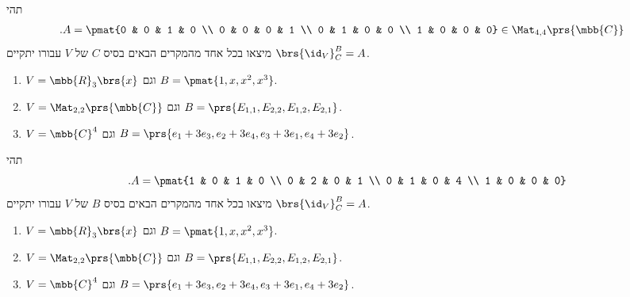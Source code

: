 \documentclass[a4paper,10pt,twoside,openany]{article}
\begin{document}
\begin{exercise}
תהי
\begin{align*}
\text{.} A &= \pmat{0 & 0 & 1 & 0 \\ 0 & 0 & 0 & 1 \\ 0 & 1 & 0 & 0 \\ 1 & 0 & 0 & 0} \in \Mat_{4,4}\prs{\mbb{C}}
\end{align*}
מיצאו בכל אחד מהמקרים הבאים בסיס
$C$
של
$V$
עבורו יתקיים
$\brs{\id_V}^B_C = A$.

\begin{enumerate}
\item $V = \mbb{R}_3\brs{x}$
וגם
$B = \pmat{1,x,x^2,x^3}$.

\item $V = \Mat_{2,2}\prs{\mbb{C}}$
וגם
$B = \prs{E_{1,1}, E_{2,2}, E_{1,2}, E_{2,1}}$.

\item $V = \mbb{C}^4$
וגם
$B = \prs{e_1 + 3e_3, e_2+3e_4, e_3+3e_1, e_4+3e_2}$.
\end{enumerate}
\end{exercise}

\begin{exercise}
תהי
\[\text{.} A = \pmat{1 & 0 & 1 & 0 \\ 0 & 2 & 0 & 1 \\ 0 & 1 & 0 & 4 \\ 1 & 0 & 0 & 0}\]
מיצאו בכל אחד מהמקרים הבאים בסיס
$B$
של
$V$
עבורו יתקיים
$\brs{\id_V}^B_C = A$.

\begin{enumerate}
\item $V = \mbb{R}_3\brs{x}$
וגם
$B = \pmat{1,x,x^2,x^3}$.

\item $V = \Mat_{2,2}\prs{\mbb{C}}$
וגם
$B = \prs{E_{1,1}, E_{2,2}, E_{1,2}, E_{2,1}}$.

\item $V = \mbb{C}^4$
וגם
$B = \prs{e_1 + 3e_3, e_2+3e_4, e_3+3e_1, e_4+3e_2}$.
\end{enumerate}
\end{exercise}
\end{document}
